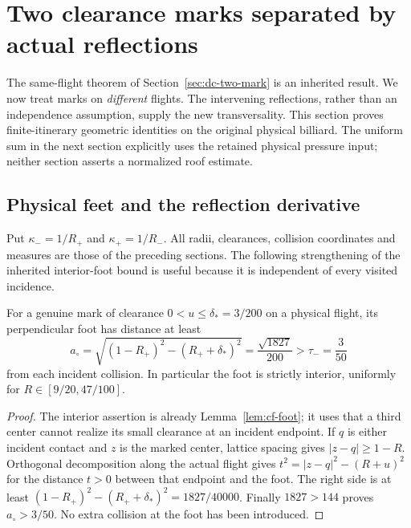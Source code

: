 \section{Two clearance marks separated by actual reflections}
\label{sec:xf-jacobi}
The same-flight theorem of Section~\ref{sec:dc-two-mark} is an
inherited result. We now treat marks on \emph{different} flights.
The intervening reflections, rather than an independence assumption,
supply the new transversality. This section proves finite-itinerary
geometric identities on the original physical billiard. The uniform
sum in the next section explicitly uses the retained physical pressure
input; neither section asserts a normalized roof estimate.

\subsection{Physical feet and the reflection derivative}
Put $\kappa_-=1/R_+$ and $\kappa_+=1/R_-$. All radii, clearances,
collision coordinates and measures are those of the preceding sections.
The following strengthening of the inherited interior-foot bound is
useful because it is independent of every visited incidence.
\begin{lemma}
\label{lem:xf-standoff}
For a genuine mark of clearance $0<u\le\delta_*=3/200$ on a
physical flight, its perpendicular foot has distance at least
\begin{equation}\label{eq:xf-standoff}
 a_\circ=\sqrt{(1-R_+)^2-(R_++\delta_*)^2}
          =\frac{\sqrt{1827}}{200}>\tau_-=\frac{3}{50}
\end{equation}
from each incident collision. In particular the foot is strictly
interior, uniformly for $R\in[9/20,47/100]$.
\end{lemma}
\begin{proof}
The interior assertion is already Lemma~\ref{lem:cf-foot}; it uses
that a third center cannot realize its small clearance at an incident
endpoint. If $q$ is either incident contact and $z$ is the marked
center, lattice spacing gives $|z-q|\ge1-R$. Orthogonal decomposition
along the actual flight gives $t^2=|z-q|^2-(R+u)^2$ for the distance
$t>0$ between that endpoint and the foot. The right side is at least
$(1-R_+)^2-(R_++\delta_*)^2=1827/40000$. Finally
$1827>144$ proves $a_\circ>3/50$. No extra collision at the foot
has been introduced.
\end{proof}

